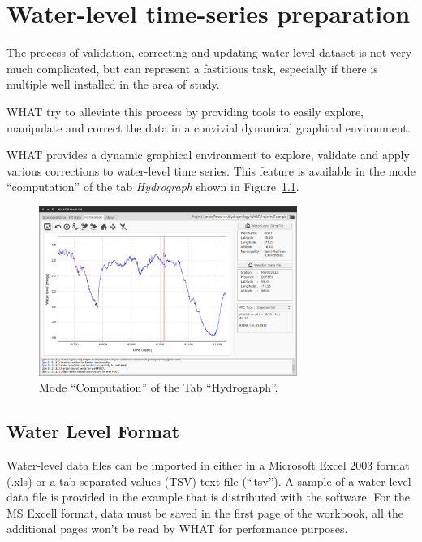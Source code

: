 \documentclass[WHATMANUAL.tex]{subfiles}
\begin{document}
\chapter{Water-level time-series preparation}\label{chap:wlvl_formatting}

The process of validation, correcting and updating water-level dataset is not very much complicated, but can represent a fastitious task, especially if there is multiple well installed in the area of study.

WHAT try to alleviate this process by providing tools to easily explore, manipulate and correct the data in a convivial dynamical graphical environment.

WHAT provides a dynamic graphical environment to explore, validate and apply various corrections to water-level time series. This feature is available in the mode ``computation'' of the tab \emph{Hydrograph} shown in Figure~\ref{fig:tab_hydrograph_computation}.

\begin{figure}[h!]
\centering
\includegraphics[width=0.75\textwidth]{img/WHAT_Screenshot003}
\caption[Mode ``Computation'' of the Tab ``Hydrograph''.]{Mode ``Computation'' of the Tab ``Hydrograph''.}
\label{fig:tab_hydrograph_computation}
\end{figure}

\section{Water Level Format}

Water-level data files can be imported in either in a Microsoft Excel 2003 format (.xls) or a tab-separated values (TSV) text file (``.tsv''). A sample of a water-level data file is provided in the example that is distributed with the software. For the MS Excell format, data must be saved in the first page of the workbook, all the additional pages won't be read by WHAT for performance purposes.
\end{document}
